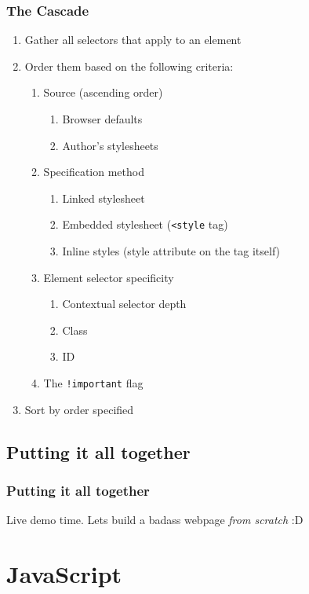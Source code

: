 \documentclass[10pt]{beamer}
\begin{document}
\frame
{
  \frametitle{The Cascade}

  \begin{enumerate}
    \item Gather all selectors that apply to an element
    \item Order them based on the following criteria:
      \begin{enumerate}
        \item Source (ascending order)
          \begin{enumerate}
            \item Browser defaults
            \item Author's stylesheets
          \end{enumerate}
        \item Specification method
          \begin{enumerate}
            \item Linked stylesheet
            \item Embedded stylesheet (\lstinline|<style| tag)
            \item Inline styles (style attribute on the tag itself)
          \end{enumerate}
        \item Element selector specificity
          \begin{enumerate}
            \item Contextual selector depth
            \item Class
            \item ID
          \end{enumerate}
        \item The \lstinline|!important| flag
      \end{enumerate}
    \item Sort by order specified
  \end{enumerate}
}

\subsection{Putting it all together}
\frame
{
  \frametitle{Putting it all together}

  Live demo time. Lets build a badass webpage \emph{from scratch} :D
}

\section{JavaScript}
\end{document}
